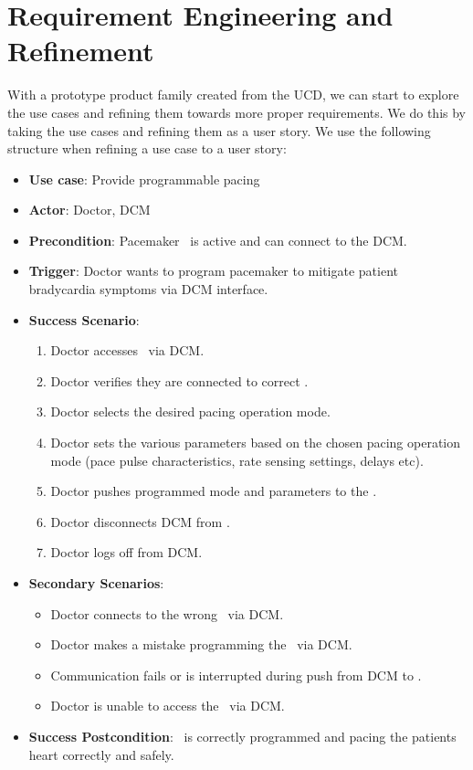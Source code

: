 \section{Requirement Engineering and Refinement}

With a prototype product family created from the UCD, we can start to explore the use cases and refining them towards more proper requirements. We do this by taking the use cases and refining them as a user story. We use the following structure when refining a use case to a user story:

\begin{itemize}
	\item \textbf{Use case}: Provide programmable pacing
	\item \textbf{Actor}: Doctor, DCM
	\item \textbf{Precondition}: Pacemaker \pgd\ is active and can connect to the DCM.
	\item \textbf{Trigger}: Doctor wants to program pacemaker to mitigate patient bradycardia symptoms via DCM interface.
	\item \textbf{Success Scenario}:
	\begin{enumerate}
		\item Doctor accesses \pgd\ via DCM.
		\item Doctor verifies they are connected to correct \pgd.
		\item Doctor selects the desired pacing operation mode.
		\item Doctor sets the various parameters based on the chosen pacing operation mode (pace pulse characteristics, rate sensing settings, delays etc).
		\item Doctor pushes programmed mode and parameters to the \pgd.
		\item Doctor disconnects DCM from \pgd.
		\item Doctor logs off from DCM.
	\end{enumerate}
	\item \textbf{Secondary Scenarios}:
	\begin{itemize}
		\item Doctor connects to the wrong \pgd\ via DCM.
		\item Doctor makes a mistake programming the \pgd\ via DCM.
		\item Communication fails or is interrupted during push from DCM to \pgd.
		\item Doctor is unable to access the \pgd\ via DCM.
	\end{itemize}
	\item \textbf{Success Postcondition}: \pgd\ is correctly programmed and pacing the patients heart correctly and safely.
\end{itemize}

